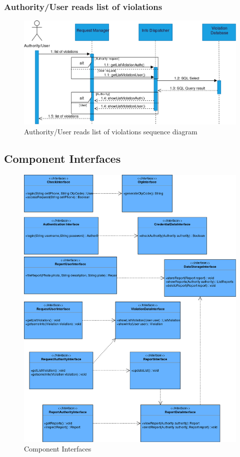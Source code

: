 \subsubsection{Authority/User reads list of violations}
	\begin{figure}[H]
		\includegraphics[width=\textwidth]{Images/RunTimeViewListViolation.png}		
		\caption{\label{fig:UserReport}Authority/User reads list of violations sequence diagram}
	\end{figure}

\newpage
\subsection{Component Interfaces}
\begin{figure}[H]
		\includegraphics[width=\textwidth]{Images/ComponentInterfaces.png}		
		\caption{\label{fig:ComponentInterfaces}Component Interfaces}
	\end{figure}
\newpage
